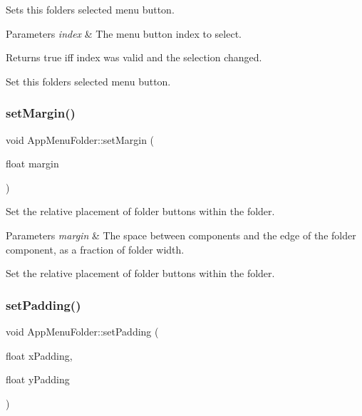 Sets this folder\textquotesingle{}s selected menu button.


\begin{DoxyParams}{Parameters}
{\em index} & The menu button index to select.\\
\hline
\end{DoxyParams}
\begin{DoxyReturn}{Returns}
true iff index was valid and the selection changed.
\end{DoxyReturn}
Set this folder\textquotesingle{}s selected menu button. \mbox{\label{classAppMenuFolder_aebb29350a1146a14e4e24e3c3def5577}} 
\subsubsection{\texorpdfstring{set\+Margin()}{setMargin()}}
{\footnotesize\ttfamily void App\+Menu\+Folder\+::set\+Margin (\begin{DoxyParamCaption}\item[{float}]{margin }\end{DoxyParamCaption})}

Set the relative placement of folder buttons within the folder.


\begin{DoxyParams}{Parameters}
{\em margin} & The space between components and the edge of the folder component, as a fraction of folder width.\\
\hline
\end{DoxyParams}
Set the relative placement of folder buttons within the folder. \mbox{\label{classAppMenuFolder_a2023b6471b3db87629dbcd70b3ef4c2b}} 
\subsubsection{\texorpdfstring{set\+Padding()}{setPadding()}}
{\footnotesize\ttfamily void App\+Menu\+Folder\+::set\+Padding (\begin{DoxyParamCaption}\item[{float}]{x\+Padding,  }\item[{float}]{y\+Padding }\end{DoxyParamCaption})}

